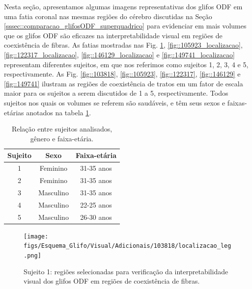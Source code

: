 Nesta seção, apresentamos algumas imagens representativas dos glifos ODF em uma fatia coronal nas mesmas regiões do cérebro discutidas na Seção \ref{sssec::comparacao_glifosODF_superquadrico} para evidenciar em mais volumes que os glifos ODF são eficazes na interpretabilidade visual em regiões de coexistência de fibras. As fatias mostradas nas Fig. \ref{fig::103818_localizacao}, \ref{fig::105923_localizacao}, \ref{fig::122317_localizacao}, \ref{fig::146129_localizacao} e \ref{fig::149741_localizacao} representam diferentes sujeitos, em que nos referimos como sujeitos 1, 2, 3, 4 e 5, respectivamente. As Fig. \ref{fig::103818}, \ref{fig::105923}, \ref{fig::122317}, \ref{fig::146129} e \ref{fig::149741} ilustram as regiões de coexistência de tratos em um fator de escala maior para os sujeitos a serem discutidos de 1 a 5, respectivamente. Todos sujeitos nos quais os volumes se referem são saudáveis, e têm seus sexos e faixas-etárias anotados na tabela \ref{tab::vol_id}.

\begin{table}[htb]
\centering
\begin{tabular}{|c|c|c|}
\hline
\textbf{Sujeito} & \textbf{Sexo} & \textbf{Faixa-etária} \\ \hline
1                & Feminino      & 31-35 anos            \\ \hline
2                & Feminino      & 31-35 anos            \\ \hline
3                & Masculino     & 31-35 anos            \\ \hline
4                & Masculino     & 22-25 anos            \\ \hline
5                & Masculino     & 26-30 anos            \\ \hline
\end{tabular}
\caption{Relação entre sujeitos analisados, gênero e faixa-etária.}
\label{tab::vol_id}
\end{table}




\begin{figure}[H]
     \centering
     \texttt{[image: figs/Esquema\_Glifo/Visual/Adicionais/103818/localizacao\_leg.png]}
      \caption{Sujeito 1: regiões selecionadas para verificação da interpretabilidade visual dos glifos ODF em regiões de coexistência de fibras.}
       \label{fig::103818_localizacao}
 \end{figure}

